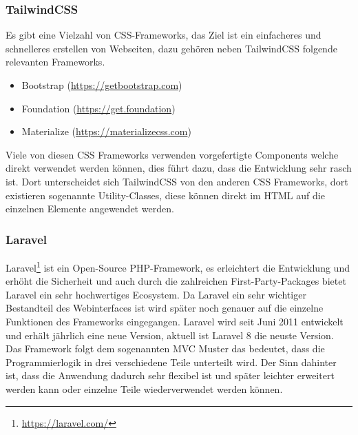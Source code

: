 \subsubsection{TailwindCSS}
Es gibt eine Vielzahl von CSS-Frameworks, das Ziel ist ein einfacheres und
schnelleres erstellen von Webseiten, dazu gehören neben TailwindCSS folgende
relevanten Frameworks.

\begin{itemize}
  \item Bootstrap (\url{https://getbootstrap.com})
  \item Foundation (\url{https://get.foundation})
  \item Materialize (\url{https://materializecss.com})
\end{itemize}

Viele von diesen CSS Frameworks verwenden vorgefertigte Components welche direkt
verwendet werden können, dies führt dazu, dass die Entwicklung sehr rasch ist.
Dort unterscheidet sich TailwindCSS von den anderen CSS Frameworks, dort
existieren sogenannte Utility-Classes, diese können direkt im \acs*{HTML} auf die
einzelnen Elemente angewendet werden.


\subsubsection{Laravel}
Laravel\footnote{\url{https://laravel.com/}} ist ein Open-Source PHP-Framework, es erleichtert die Entwicklung und
erhöht die Sicherheit und auch durch die zahlreichen First-Party-Packages bietet
Laravel ein sehr hochwertiges Ecosystem. Da Laravel ein sehr wichtiger Bestandteil des
Webinterfaces ist wird später noch genauer auf die einzelne Funktionen des
Frameworks eingegangen. Laravel wird seit Juni 2011 entwickelt und erhält
jährlich eine neue Version, aktuell ist Laravel 8 die neuste Version.\\

Das Framework folgt dem sogenannten \ac*{MVC} Muster das bedeutet, dass die
Programmierlogik in drei verschiedene Teile unterteilt wird. Der Sinn dahinter
ist, dass die Anwendung dadurch sehr flexibel ist und später leichter erweitert
werden kann oder einzelne Teile wiederverwendet werden können.

